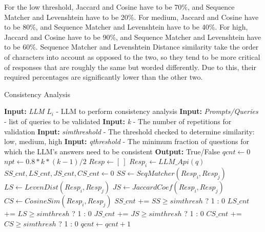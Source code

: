 For the low threshold, Jaccard and Cosine have to be 70\%, and Sequence Matcher and Levenshtein have to be 20\%. For medium, Jaccard and Cosine have to be 80\%, and Sequence Matcher and Levenshtein have to be 40\%. For high, Jaccard and Cosine have to be 90\%, and Sequence Matcher and Levenshtein have to be 60\%. Sequence Matcher and Levenshtein Distance similarity take the order of characters into account as opposed to the two, so they tend to be more critical of responses that are roughly the same but worded differently. Due to this, their required percentages are significantly lower than the other two.

\begin{algorithm}[tb]
\caption{Consistency Analysis}
\label{alg:consistency}
\begin{algorithmic}[1]
\Statex \textbf{Input:} \textit{LLM} $L_i$ -  LLM to perform consistency analysis
\Statex \textbf{Input:} \textit{Prompts/Queries} -  list of queries to be validated
\Statex \textbf{Input:} \textit{k} - The number of repetitions for validation
\Statex \textbf{Input:} \textit{simthreshold} - The threshold checked to determine similarity: low, medium, high
\Statex \textbf{Input:} \textit{qthreshold} - The minimum fraction of questions for which the LLM's answers need to be consistent
\Statex
\Statex \textbf{Output:} True/False
\Statex
{}
\State $qcnt \gets 0$
\State $npt \gets 0.8 * k * (k-1) / 2$
  \State $Resp \gets [~]$
    \State $Resp_i \gets LLM\_Api(q)$
  \EndFor
  \State $SS\_cnt,LS\_cnt,JS\_cnt,CS\_cnt \gets 0$
        \State $SS \gets SeqMatcher(Resp_i,Resp_j)$
        \State $LS \gets LevenDist(Resp_i,Resp_j)$
        \State $JS \gets JaccardCoef(Resp_i,Resp_j)$
        \State $CS \gets CosineSim(Resp_i,Resp_j)$
        \State $SS\_cnt$ += $SS \ge simthresh$ ? 1 : 0
        \State $LS\_cnt$ += $LS \ge simthresh$ ? 1 : 0
        \State $JS\_cnt$ += $JS \ge simthresh$ ? 1 : 0
        \State $CS\_cnt$ += $CS \ge simthresh$ ? 1 : 0
    \EndFor
  \EndFor
    \State $qcnt \gets qcnt + 1$
  \EndIf
\EndFor
{}
  \State {}
\Else
  \State {}
\EndIf
\EndProcedure
\end{algorithmic}
\end{algorithm}


